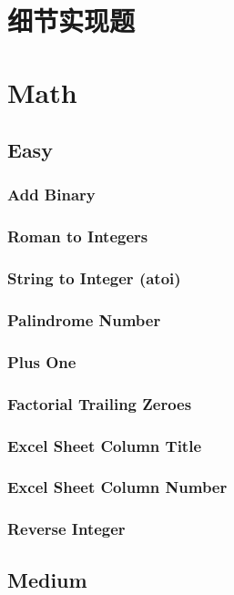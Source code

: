 \documentclass[12pt]{book}
\begin{document}
\chapter{细节实现题}
\label{sec-20}

\chapter{Math}
\label{sec-21}
\section{Easy}
\label{sec-21-1}
\subsection{Add Binary}
\label{sec-21-1-1}
\subsection{Roman to Integers}
\label{sec-21-1-2}
\subsection{String to Integer (atoi)}
\label{sec-21-1-3}
\subsection{Palindrome Number}
\label{sec-21-1-4}
\subsection{Plus One}
\label{sec-21-1-5}

\subsection{Factorial Trailing Zeroes}
\label{sec-21-1-6}
\subsection{Excel Sheet Column Title}
\label{sec-21-1-7}
\subsection{Excel Sheet Column Number}
\label{sec-21-1-8}
\subsection{Reverse Integer}
\label{sec-21-1-9}
\section{Medium}
\label{sec-21-2}
\end{document}

